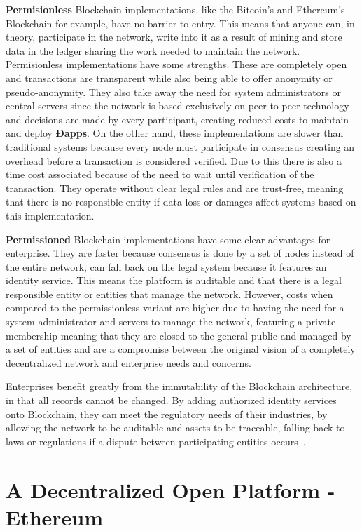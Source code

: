 \textbf{Permisionless} Blockchain implementations, like the Bitcoin's and
Ethereum's Blockchain for example, have no barrier to entry. This means that
anyone can, in theory, participate in the network, write into it as a result of
mining and store data in the ledger sharing the work needed to maintain the
network.  Permisionless implementations have some strengths. These are
completely open and transactions are transparent while also being able to offer
anonymity or pseudo-anonymity. They also take away the need for system
administrators or central servers since the network is based exclusively on
peer-to-peer technology and decisions are made by every participant, creating
reduced costs to maintain and deploy \textbf{Ðapps}. On the other hand, these
implementations are slower than traditional systems because every node must
participate in consensus creating an overhead before a transaction is
considered verified. Due to this there is also a time cost associated because
of the need to wait until verification of the transaction. They operate without
clear legal rules and are trust-free, meaning that there is no responsible
entity if data loss or damages affect systems based on this implementation.

\textbf{Permissioned} Blockchain implementations have some clear advantages for
enterprise. They are faster because consensus is done by a set of nodes instead
of the entire network, can fall back on the legal system because it features an
identity service. This means the platform is auditable and that there is a
legal responsible entity or entities that manage the network. However, costs
when compared to the permissionless variant are higher due to having the need
for a system administrator and servers to manage the network, featuring a
private membership meaning that they are closed to the general public and
managed by a set of entities and are a compromise between the original vision
of a completely decentralized network and enterprise needs and concerns. 

Enterprises benefit greatly from the immutability of the Blockchain
architecture, in that all records cannot be changed. By adding authorized
identity services onto Blockchain, they can meet the regulatory needs of their
industries, by allowing the network to be auditable and assets to be traceable,
falling back to laws or regulations if a dispute between participating entities
occurs~\cite{Barclay2017}.

\section{A Decentralized Open Platform - Ethereum}

